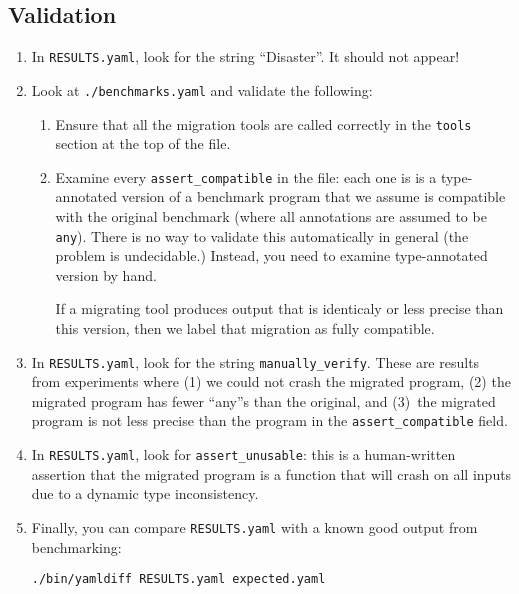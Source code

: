 \documentclass{article}
\begin{document}
\subsection{Validation}

\begin{enumerate}

\item In \texttt{RESULTS.yaml}, look for the string ``Disaster''. It should not
      appear!
     
\item Look at \texttt{./benchmarks.yaml} and validate the following:
\begin{enumerate}
  
  \item Ensure that all the migration tools are called correctly in the
  \texttt{tools} section at the top of the file.
  
  \item Examine every \verb|assert_compatible| in the file: each one is
  is a type-annotated version of a benchmark program that we assume is
  compatible with the original benchmark (where all annotations are assumed
  to be \texttt{any}). There is no way to validate this automatically 
  in general (the problem is undecidable.) Instead, you need to examine
  type-annotated version by hand.
  
  If a migrating tool produces output that is identicaly or less precise
  than this version, then we label that migration as fully compatible.  

\end{enumerate}

\item In \texttt{RESULTS.yaml}, look for the string \verb|manually_verify|.
These are results from experiments where (1) we could not crash the migrated
program, (2) the migrated program has fewer ``any''s than the original, and
(3)~the migrated program is not less precise than the program in the
\verb|assert_compatible| field.

\item In \texttt{RESULTS.yaml}, look for \verb|assert_unusable|: this
is a human-written assertion that the migrated program is a function that
will crash on all inputs due to a dynamic type inconsistency.

\item Finally, you can compare \texttt{RESULTS.yaml} with a known good output
from benchmarking:

\begin{verbatim}
./bin/yamldiff RESULTS.yaml expected.yaml
\end{verbatim}

\end{enumerate}
\end{document}
